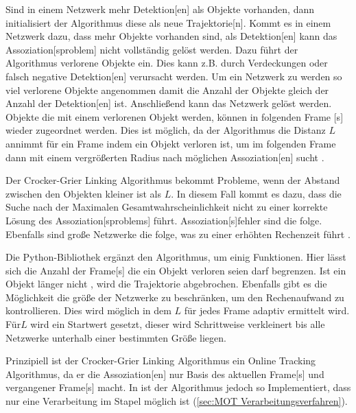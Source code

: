 Sind in einem Netzwerk mehr \gls{Detektion}[en] als Objekte vorhanden, dann initialisiert der Algorithmus diese als neue \gls{Trajektorie}[n]. Kommt es in einem Netzwerk dazu, dass mehr Objekte vorhanden sind, als \gls{Detektion}[en] kann das \gls{Assoziation}[sproblem] nicht vollständig gelöst werden. Dazu führt der Algorithmus verlorene Objekte ein. Dies kann z.B. durch Verdeckungen oder falsch negative \gls{Detektion}[en] verursacht werden. Um ein Netzwerk zu  werden so viel verlorene Objekte angenommen damit die Anzahl der Objekte gleich der Anzahl der \gls{Detektion}[en] ist. Anschließend kann das Netzwerk gelöst werden. Objekte die mit einem verlorenen Objekt  werden, können in folgenden \gls{Frame} [s] wieder zugeordnet werden. Dies ist möglich, da der Algorithmus die Distanz \(L\) annimmt für ein \gls{Frame} indem ein Objekt verloren ist, um im folgenden \gls{Frame} dann mit einem vergrößerten Radius nach möglichen \gls{Assoziation}[en] sucht \cite{Crocker.1996}. \par 

Der Crocker-Grier Linking Algorithmus bekommt Probleme, wenn der Abstand zwischen den Objekten kleiner ist als \(L\). In diesem Fall kommt es dazu, dass die Suche nach der Maximalen Gesamtwahrscheinlichkeit nicht zu einer korrekte Lösung des \gls{Assoziation}[sproblems] führt. \gls{Assoziation}[s]fehler sind die folge. Ebenfalls sind große Netzwerke die folge, was zu einer erhöhten Rechenzeit führt \cite{Crocker.1996}. \par

Die \gls{Python}-\gls{Bibliothek} \cite{Allan.2023} ergänzt den Algorithmus, um einig Funktionen. Hier lässt sich die Anzahl der \gls{Frame}[s] die ein Objekt verloren seien darf begrenzen. Ist ein Objekt länger nicht , wird die \gls{Trajektorie} abgebrochen. Ebenfalls gibt es die Möglichkeit die größe der Netzwerke zu beschränken, um den Rechenaufwand zu kontrollieren. Dies wird möglich in dem \(L\) für jedes \gls{Frame} adaptiv ermittelt wird. Für\(L\) wird ein Startwert gesetzt, dieser wird Schrittweise verkleinert bis alle Netzwerke unterhalb einer bestimmten Größe liegen. \par

Prinzipiell ist der Crocker-Grier Linking Algorithmus ein \gls{Online Tracking} Algorithmus, da er die \gls{Assoziation}[en] nur Basis des aktuellen \gls{Frame}[s] und vergangener \gls{Frame}[s] macht. In \cite{Allan.2023} ist der Algorithmus jedoch so Implementiert, dass nur eine Verarbeitung im Stapel möglich ist (\ref{sec:MOT Verarbeitungsverfahren}). 

